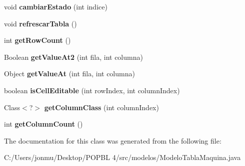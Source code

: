 \begin{DoxyCompactItemize}
void {\bfseries cambiar\+Estado} (int indice)
\item 
\mbox{\label{classmodelos_1_1_modelo_tabla_maquina_a48d1751bbb3bfb91d50eb5bd2a80207e}} 
void {\bfseries refrescar\+Tabla} ()
\item 
\mbox{\label{classmodelos_1_1_modelo_tabla_maquina_aa380cce066ff74a0a7f95ae4d9388eb9}} 
int {\bfseries get\+Row\+Count} ()
\item 
\mbox{\label{classmodelos_1_1_modelo_tabla_maquina_a76d930fbec2a211e91095ac641f030cb}} 
Boolean {\bfseries get\+Value\+At2} (int fila, int columna)
\item 
\mbox{\label{classmodelos_1_1_modelo_tabla_maquina_ae6611198ecf631949ddb041b8231da95}} 
Object {\bfseries get\+Value\+At} (int fila, int columna)
\item 
\mbox{\label{classmodelos_1_1_modelo_tabla_maquina_ab81f2b02aa2cc4c0f9c93111ba345df8}} 
boolean {\bfseries is\+Cell\+Editable} (int row\+Index, int column\+Index)
\item 
\mbox{\label{classmodelos_1_1_modelo_tabla_maquina_a29f3df9756e2a5e9a66bde094a1ee56e}} 
Class$<$?$>$ {\bfseries get\+Column\+Class} (int column\+Index)
\item 
\mbox{\label{classmodelos_1_1_modelo_tabla_maquina_a83f4d721197d932523e11de1155cbad6}} 
int {\bfseries get\+Column\+Count} ()
\end{DoxyCompactItemize}


The documentation for this class was generated from the following file\+:\begin{DoxyCompactItemize}
\item 
C\+:/\+Users/jonmu/\+Desktop/\+P\+O\+P\+B\+L 4/src/modelos/Modelo\+Tabla\+Maquina.\+java\end{DoxyCompactItemize}
